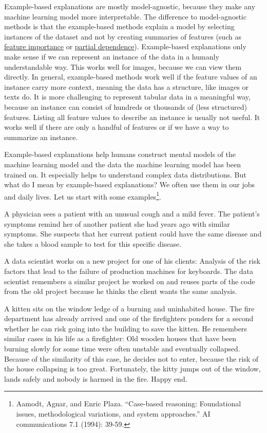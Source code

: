 \documentclass[
  12pt,
]{krantz}
\begin{document}
Example-based explanations are mostly model-agnostic, because they make any machine learning model more interpretable.
The difference to model-agnostic methods is that the example-based methods explain a model by selecting instances of the dataset and not by creating summaries of features (such as \protect\hyperlink{feature-importance}{feature importance} or \protect\hyperlink{pdp}{partial dependence}).
Example-based explanations only make sense if we can represent an instance of the data in a humanly understandable way.
This works well for images, because we can view them directly.
In general, example-based methods work well if the feature values of an instance carry more context, meaning the data has a structure, like images or texts do.
It is more challenging to represent tabular data in a meaningful way, because an instance can consist of hundreds or thousands of (less structured) features.
Listing all feature values to describe an instance is usually not useful.
It works well if there are only a handful of features or if we have a way to summarize an instance.

Example-based explanations help humans construct mental models of the machine learning model and the data the machine learning model has been trained on.
It especially helps to understand complex data distributions.
But what do I mean by example-based explanations?
We often use them in our jobs and daily lives.
Let us start with some examples\footnote{Aamodt, Agnar, and Enric Plaza. ``Case-based reasoning: Foundational issues, methodological variations, and system approaches.'' AI communications 7.1 (1994): 39-59.}.

A physician sees a patient with an unusual cough and a mild fever.
The patient's symptoms remind her of another patient she had years ago with similar symptoms.
She suspects that her current patient could have the same disease and she takes a blood sample to test for this specific disease.

A data scientist works on a new project for one of his clients:
Analysis of the risk factors that lead to the failure of production machines for keyboards.
The data scientist remembers a similar project he worked on and reuses parts of the code from the old project because he thinks the client wants the same analysis.

A kitten sits on the window ledge of a burning and uninhabited house.
The fire department has already arrived and one of the firefighters ponders for a second whether he can risk going into the building to save the kitten.
He remembers similar cases in his life as a firefighter:
Old wooden houses that have been burning slowly for some time were often unstable and eventually collapsed.
Because of the similarity of this case, he decides not to enter, because the risk of the house collapsing is too great.
Fortunately, the kitty jumps out of the window, lands safely and nobody is harmed in the fire. Happy end.
\end{document}
